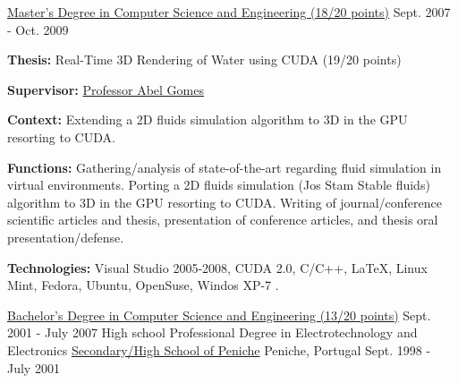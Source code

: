 \begin{cventries}
{    }
  \vspace{-0.7cm}  
  \cventry
    {\href{https://www.ubi.pt/en/course/804}{Master's Degree in Computer Science and Engineering (18/20 points)}} %
    {} %
    {} %
    {Sept. 2007 - Oct. 2009} %
    {
      \begin{cvitems} %
        \item[] {\textbf{Thesis:} Real-Time 3D Rendering of Water using CUDA (19/20 points)}
        \item[] {\textbf{Supervisor:} \href{http://www.di.ubi.pt/~agomes/}{Professor Abel Gomes}}
		\item[] {\textbf{Context:} Extending a 2D fluids simulation algorithm to 3D in the GPU resorting to CUDA.}
		\item[] {\textbf{Functions:} Gathering/analysis of state-of-the-art regarding fluid simulation in virtual environments. Porting a 2D fluids simulation (Jos Stam Stable fluids) algorithm to 3D in the GPU resorting to CUDA. Writing of journal/conference scientific articles and thesis, presentation of conference articles, and thesis oral presentation/defense.}
        \item[] {\textbf{Technologies:}  \textcolor{rainbowcolor-olive}{Visual Studio 2005-2008}, \textcolor{rainbowcolor-indigo}{CUDA 2.0}, \textcolor{rainbowcolor-indigo}{C/C++}, 
\textcolor{rainbowcolor-indigo}{LaTeX}, %
\textcolor{rainbowcolor-orange}{Linux Mint}, \textcolor{rainbowcolor-orange}{Fedora}, \textcolor{rainbowcolor-orange}{Ubuntu}, \textcolor{rainbowcolor-orange}{OpenSuse}, \textcolor{rainbowcolor-orange}{Windos XP-7}       
      	.}
      \end{cvitems}
    }
  \cventry
    {\href{https://www.ubi.pt/en/course/42}{Bachelor's Degree in Computer Science and Engineering (13/20 points)}} %
    {} %
    {} %
    {Sept. 2001 - July 2007} %
    {
    }
  \vspace{-0.55cm}
  \cventry
    {High school Professional Degree in Electrotechnology and Electronics} %
    {\href{http://espeniche.pt/sitesp/index.php}{Secondary/High School of Peniche}} %
    {Peniche, Portugal} %
    {Sept. 1998 - July 2001} %
    {
    }
\end{cventries}
